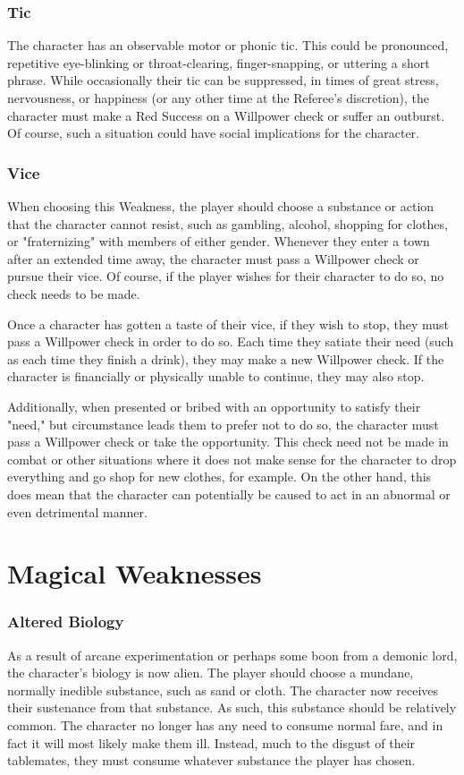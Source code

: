 \documentclass[oneside]{book}
\begin{document}
\begin{multicols}{2}
\subsubsection{Tic}
The character has an observable motor or phonic tic. This could be pronounced, repetitive eye-blinking or throat-clearing, finger-snapping, or uttering a short phrase. While occasionally their tic can be suppressed, in times of great stress, nervousness, or happiness (or any other time at the Referee's discretion), the character must make a Red Success on a Willpower check or suffer an outburst. Of course, such a situation could have social implications for the character. 

\subsubsection{Vice}
When choosing this Weakness, the player should choose a substance or action that the character cannot resist, such as gambling, alcohol, shopping for clothes, or "fraternizing" with members of either gender. Whenever they enter a town after an extended time away, the character must pass a Willpower check or pursue their vice. Of course, if the player wishes for their character to do so, no check needs to be made.

Once a character has gotten a taste of their vice, if they wish to stop, they must pass a Willpower check in order to do so. Each time they satiate their need (such as each time they finish a drink), they may make a new Willpower check. If the character is financially or physically unable to continue, they may also stop. 

Additionally, when presented or bribed with an opportunity to satisfy their "need," but circumstance leads them to prefer not to do so, the character must pass a Willpower check or take the opportunity. This check need not be made in combat or other situations where it does not make sense for the character to drop everything and go shop for new clothes, for example. On the other hand, this does mean that the character can potentially be caused to act in an abnormal or even detrimental manner. 

\section{Magical Weaknesses}
\subsubsection{Altered Biology}
As a result of arcane experimentation or perhaps some boon from a demonic lord, the character's biology is now alien. The player should choose a mundane, normally inedible substance, such as sand or cloth. The character now receives their sustenance from that substance. As such, this substance should be relatively common. The character no longer has any need to consume normal fare, and in fact it will most likely make them ill. Instead, much to the disgust of their tablemates, they must consume whatever substance the player has chosen. 


\end{multicols}
\end{document}
